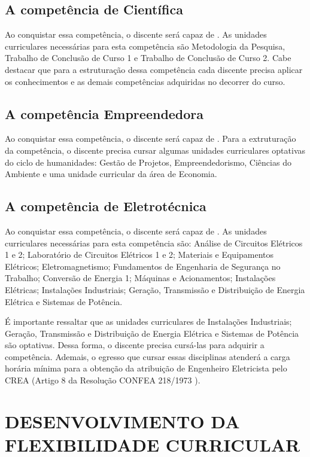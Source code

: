 \subsection{A competência de Científica}

Ao conquistar essa competência, o discente será capaz de \textbf{\compCien}. As unidades curriculares necessárias para esta competência são Metodologia da Pesquisa, Trabalho de Conclusão de Curso 1 e Trabalho de Conclusão de Curso 2. Cabe destacar que para a estruturação dessa competência cada discente precisa aplicar os conhecimentos e as demais competências adquiridas no decorrer do curso.

\subsection{A competência Empreendedora}

Ao conquistar essa competência, o discente será capaz de \textbf{\compEmp}. Para a extruturação da competência, o discente precisa cursar algumas unidades curriculares optativas do ciclo de humanidades: Gestão de Projetos, Empreendedorismo, Ciências do Ambiente e uma unidade curricular da área de Economia.

\subsection{A competência de Eletrotécnica}

Ao conquistar essa competência, o discente será capaz de \textbf{\compEle}. As unidades curriculares necessárias para esta competência são: Análise de Circuitos Elétricos 1 e 2; Laboratório de Circuitos Elétricos 1 e 2; Materiais e Equipamentos Elétricos; Eletromagnetismo; Fundamentos de Engenharia de Segurança no Trabalho; Conversão de Energia 1; Máquinas e Acionamentos; Instalações Elétricas; Instalações Industriais; Geração, Transmissão e Distribuição de Energia Elétrica e Sistemas de Potência.

É importante ressaltar que as unidades curriculares de Instalações Industriais; Geração, Transmissão e Distribuição de Energia Elétrica e Sistemas de Potência são optativas. Dessa forma, o discente precisa cursá-las para adquirir a competência. Ademais, o egresso que cursar essas disciplinas atenderá a carga horária mínima para a obtenção da atribuição de Engenheiro Eletricista pelo CREA (Artigo 8\textordmasculine{} da Resolução CONFEA 218/1973 \cite{confea1973}).

\section{DESENVOLVIMENTO DA FLEXIBILIDADE CURRICULAR}

